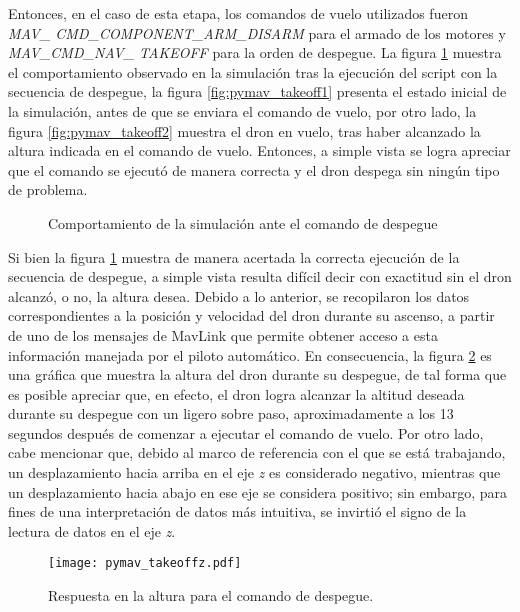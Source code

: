 Entonces, en el caso de esta etapa, los comandos de vuelo utilizados fueron \textit{MAV\_ CMD\_COMPONENT\_ARM\_DISARM} para el armado de los motores y \textit{MAV\_CMD\_NAV\_ TAKEOFF} para la orden de despegue. La figura \ref{fig:pymav_takeoff} muestra el comportamiento observado en la simulación tras la ejecución del script con la secuencia de despegue, la figura \ref{fig:pymav_takeoff1} presenta el estado inicial de la simulación, antes de que se enviara el comando de vuelo, por otro lado, la figura \ref{fig:pymav_takeoff2} muestra el dron en vuelo, tras haber alcanzado la altura indicada en el comando de vuelo. Entonces, a simple vista se logra apreciar que el comando se ejecutó de manera correcta y el dron despega sin ningún tipo de problema.  

\begin{figure}[ht]
    \centering
    \hfill
    \caption{Comportamiento de la simulación ante el comando de despegue}
    \label{fig:pymav_takeoff}
\end{figure}


Si bien la figura \ref{fig:pymav_takeoff} muestra de manera acertada la correcta ejecución de la secuencia de despegue, a simple vista resulta difícil decir con exactitud sin el dron alcanzó, o no, la altura desea. Debido a lo anterior, se recopilaron los datos correspondientes a la posición y velocidad del dron durante su ascenso, a partir de uno de los mensajes de MavLink que permite obtener acceso a esta información manejada por el piloto automático. En consecuencia, la figura \ref{fig:pymav_takeoffz} es una gráfica que muestra la altura del dron durante su despegue, de tal forma que es posible apreciar que, en efecto, el dron logra alcanzar la altitud deseada durante su despegue con un ligero sobre paso, aproximadamente a los 13 segundos después de comenzar a ejecutar el comando de vuelo. Por otro lado, cabe mencionar que, debido al marco de referencia con el que se está trabajando, un desplazamiento hacia arriba en el eje \textit{z} es considerado negativo, mientras que un desplazamiento hacia abajo en ese eje se considera positivo; sin embargo, para fines de una interpretación de datos más intuitiva, se invirtió el signo de la lectura de datos en el eje \textit{z}. 

\begin{figure}[h]
    \centering
    \texttt{[image: pymav\_takeoffz.pdf]}
    \caption{Respuesta en la altura para el comando de despegue.}
    \label{fig:pymav_takeoffz}
\end{figure}

